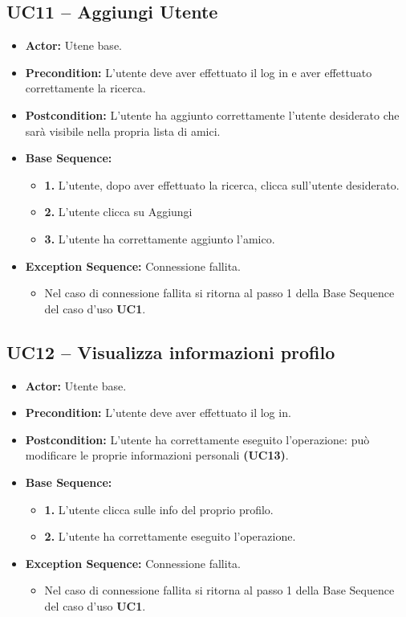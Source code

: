 \subsection{UC11 -- Aggiungi Utente}
\begin{itemize}
    \item \textbf{Actor:} Utene base.
    \item \textbf{Precondition:} L'utente deve aver effettuato il log in e aver effettuato correttamente la ricerca.
    \item \textbf{Postcondition:} L'utente ha aggiunto correttamente l'utente desiderato che sarà visibile nella propria lista di amici.
    \item \textbf{Base Sequence:}
    \begin{itemize}
        \item \textbf{1.} L'utente, dopo aver effettuato la ricerca, clicca sull'utente desiderato.
        \item \textbf{2.} L'utente clicca su Aggiungi
        \item \textbf{3.} L'utente ha correttamente aggiunto l'amico.
    \end{itemize}
    \item \textbf{Exception Sequence:} Connessione fallita.
    \begin{itemize}
        \item Nel caso di connessione fallita si ritorna al passo 1 della Base Sequence del caso d'uso \textbf{UC1}.
    \end{itemize}
\end{itemize}
\vspace{1cm}

\subsection{UC12 -- Visualizza informazioni profilo}
\begin{itemize}
    \item \textbf{Actor:} Utente base.
    \item \textbf{Precondition:} L'utente deve aver effettuato il log in.
    \item \textbf{Postcondition:} L'utente ha correttamente eseguito l'operazione: può modificare le proprie informazioni personali \textbf{(UC13)}.
    \item \textbf{Base Sequence:}
    \begin{itemize}
        \item \textbf{1.} L'utente clicca sulle info del proprio profilo.
        \item \textbf{2.} L'utente ha correttamente eseguito l'operazione.
    \end{itemize}
    
    \item \textbf{Exception Sequence:} Connessione fallita.
    \begin{itemize}
        \item Nel caso di connessione fallita si ritorna al passo 1 della Base Sequence del caso d'uso \textbf{UC1}.
    \end{itemize}
\end{itemize}
\vspace{1cm}

